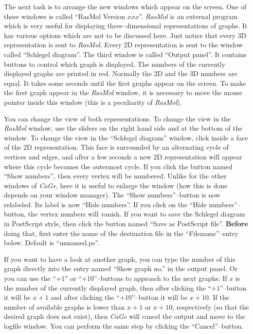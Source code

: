 \documentclass[a4paper]{article}
\def\CaGe{\textit{CaGe}}
\begin{document}
The next task is to arrange the new windows which appear on the screen.
One of these windows is called ``RasMol Version $xxx$''. 
\textit{RasMol} is an external
program which is very useful for displaying three--dimensional representations
of graphs. It has various options which are not to be discussed here. Just
notice that every 3D representation is sent to \textit{RasMol}. Every 2D
representation is sent to the window called ``Schlegel diagram''. The third
window is called ``Output panel''. It contains buttons to control which graph
is displayed. The numbers of the currently displayed graphs are printed in red.
Normally the 2D and the 3D numbers are equal. It takes some seconds until the
first graphs appear on the screen. To make the first graph appear in the
\textit{RasMol} window, it is necessary to move the mouse pointer inside this
window (this is a peculiarity of \textit{RasMol}). 

You can change the view of both representations. To change the view in the
\textit{RasMol} window, use the sliders on the right hand side and at the 
bottom of the window. To change the view in the ``Schlegel diagram'' window, 
click inside a face of the 2D representation. This face is surrounded by an 
alternating
cycle of vertices and edges, and after a few seconds a new 2D representation
will appear where this cycle becomes the outermost cycle. If you click the
button named ``Show numbers'', then every vertex will be numbered. Unlike for
the other windows of \CaGe, here it is useful to enlarge the window (how
this is done depends on your window manager). The ``Show numbers''--button is
now relabeled. Its label is now ``Hide numbers''. If you click on the ``Hide
numbers''--button, the vertex numbers will vanish.
If you want to save the Schlegel diagram in PostScript style, then click the
button named ``Save as PostScript file''. \textbf{Before} doing that, first
enter the name of the destination file in the ``Filename''--entry below.
Default is ``unnamed.ps''.
 
If you want to have a look at another graph, you can type the number of this
graph directly into the entry named ``Show graph no.'' in the output panel. 
Or you can use the 
``$+1$'' or ``$+10$''--buttons to approach to the next graphs: If $x$ is the
number of the currently displayed graph, then after clicking the 
``$+1$''--button it will be $x+1$ and after clicking the ``$+10$''--button
it
will be $x+10$. If the number of available graphs is lower than $x+1$ or
$x+10$, respectively (so that the desired graph does not exist), then \CaGe{}
will cancel the output and move to the logfile window. You can perform the
same step by clicking the ``Cancel''--button.
\end{document}
